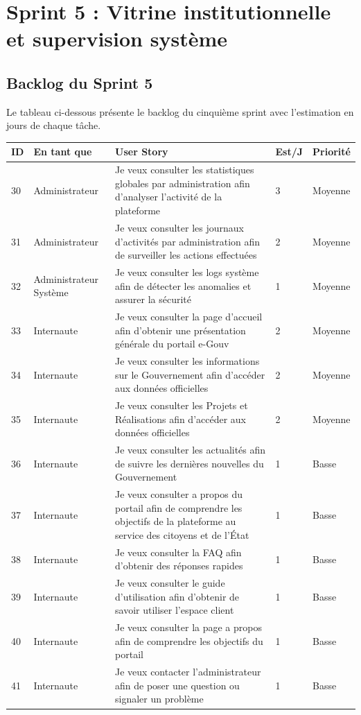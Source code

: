 \section{Sprint 5 : Vitrine institutionnelle et supervision système}


\subsection{Backlog du Sprint 5}

Le tableau ci-dessous présente le backlog du cinquième sprint avec l'estimation en jours de chaque tâche.

\begin{table}[H]
    \centering
    \begin{tabular}{ |p{1cm}|p{3cm}|p{7cm}|p{1cm}|p{2cm}|} \hline
    \rowcolor{orange!30}
    \textbf{ID} & \textbf{En tant que} & \textbf{User Story} & \textbf{Est/J} & \textbf{Priorité} \\ \hline

     30 & Administrateur & Je veux consulter les statistiques globales par administration afin d'analyser l'activité de la plateforme & 3 & Moyenne \\ \hline
    31 & Administrateur & Je veux consulter les journaux d'activités par administration afin de surveiller les actions effectuées & 2 & Moyenne \\ \hline
    32 & Administrateur Système & Je veux consulter les logs système afin de détecter les anomalies et assurer la sécurité & 1 & Moyenne \\ \hline
    33 & Internaute & Je veux consulter la page d'accueil afin d'obtenir une présentation générale du portail e-Gouv & 2 & Moyenne \\ \hline
    34 & Internaute & Je veux consulter les informations sur le Gouvernement afin d'accéder aux données officielles & 2 & Moyenne \\ \hline
    35 & Internaute & Je veux consulter les Projets et Réalisations afin d'accéder aux données officielles & 2 & Moyenne \\ \hline
    36 & Internaute & Je veux consulter les actualités afin de suivre les dernières nouvelles du Gouvernement & 1 & Basse \\ \hline
    37 & Internaute & Je veux consulter a propos du portail afin de comprendre les objectifs de la plateforme au service des citoyens et de l'État  & 1 & Basse \\ \hline
    38 & Internaute & Je veux consulter la FAQ afin d'obtenir des réponses rapides & 1 & Basse \\ \hline
    39 & Internaute & Je veux consulter le guide d'utilisation afin d'obtenir de savoir utiliser l'espace client & 1 & Basse \\ \hline
    40 & Internaute & Je veux consulter la page a propos afin de comprendre les objectifs du portail & 1 & Basse \\ \hline
    41 & Internaute & Je veux contacter l'administrateur afin de poser une question ou signaler un problème & 1 & Basse \\ \hline


\end{tabular}
\end{table}

